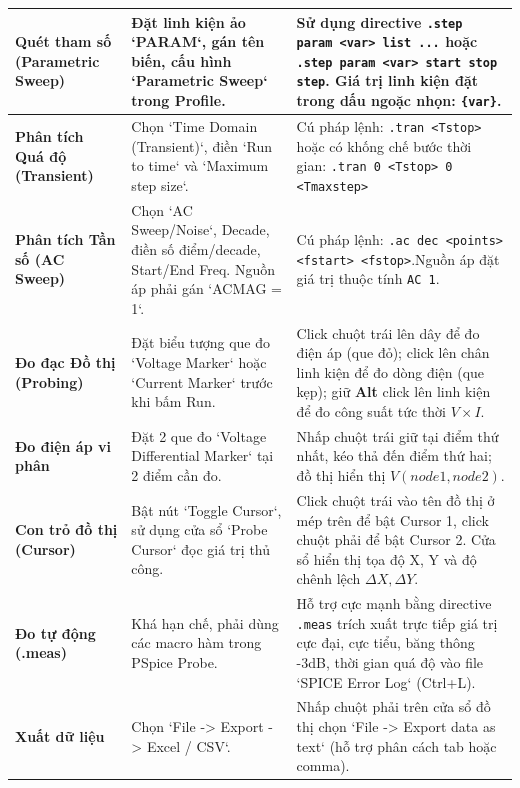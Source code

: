 \documentclass[12pt,a4paper]{report}
\begin{document}
\begin{longtable}{|p{3.2cm}|p{6.0cm}|p{6.0cm}|}
\textbf{Quét tham số (Parametric Sweep)} & 
Đặt linh kiện ảo `PARAM`, gán tên biến, cấu hình `Parametric Sweep` trong Profile. & 
Sử dụng directive \lstinline|.step param <var> list ...| hoặc \lstinline|.step param <var> start stop step|. Giá trị linh kiện đặt trong dấu ngoặc nhọn: \lstinline|{var}|. \\ \hline

\textbf{Phân tích Quá độ (Transient)} & 
Chọn `Time Domain (Transient)`, điền `Run to time` và `Maximum step size`. & 
Cú pháp lệnh: \lstinline|.tran <Tstop>| hoặc có khống chế bước thời gian: \lstinline|.tran 0 <Tstop> 0 <Tmaxstep>| \\ \hline

\textbf{Phân tích Tần số (AC Sweep)} & 
Chọn `AC Sweep/Noise`, Decade, điền số điểm/decade, Start/End Freq. Nguồn áp phải gán `ACMAG = 1`. & 
Cú pháp lệnh: \lstinline|.ac dec <points> <fstart> <fstop>|.\newline Nguồn áp đặt giá trị thuộc tính \lstinline|AC 1|. \\ \hline

\textbf{Đo đạc Đồ thị (Probing)} & 
Đặt biểu tượng que đo `Voltage Marker` hoặc `Current Marker` trước khi bấm Run. & 
Click chuột trái lên dây để đo điện áp (que đỏ); click lên chân linh kiện để đo dòng điện (que kẹp); giữ \textbf{Alt} click lên linh kiện để đo công suất tức thời $V \times I$. \\ \hline

\textbf{Đo điện áp vi phân} & 
Đặt 2 que đo `Voltage Differential Marker` tại 2 điểm cần đo. & 
Nhấp chuột trái giữ tại điểm thứ nhất, kéo thả đến điểm thứ hai; đồ thị hiển thị $V(node1, node2)$. \\ \hline

\textbf{Con trỏ đồ thị (Cursor)} & 
Bật nút `Toggle Cursor`, sử dụng cửa sổ `Probe Cursor` đọc giá trị thủ công. & 
Click chuột trái vào tên đồ thị ở mép trên để bật Cursor 1, click chuột phải để bật Cursor 2. Cửa sổ hiển thị tọa độ X, Y và độ chênh lệch $\Delta X, \Delta Y$. \\ \hline

\textbf{Đo tự động (.meas)} & 
Khá hạn chế, phải dùng các macro hàm trong PSpice Probe. & 
Hỗ trợ cực mạnh bằng directive \lstinline|.meas| trích xuất trực tiếp giá trị cực đại, cực tiểu, băng thông -3dB, thời gian quá độ vào file `SPICE Error Log` (Ctrl+L). \\ \hline

\textbf{Xuất dữ liệu} & 
Chọn `File -> Export -> Excel / CSV`. & 
Nhấp chuột phải trên cửa sổ đồ thị chọn `File -> Export data as text` (hỗ trợ phân cách tab hoặc comma). \\ \hline


\end{longtable}
\end{document}
